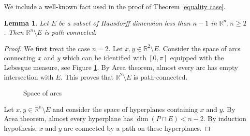 \documentclass[12pt,twoside]{article}
\theoremstyle{plain}
\newtheorem{lem}[theorem]{Lemma}
\theoremstyle{definition}
\theoremstyle{remark}
\newcommand{\R}{\mathbb{R}}
\numberwithin{equation}{section}
\begin{document}
We include a well-known fact used in the proof of Theorem \ref{equality case}.
\begin{lem}\label{path-connected}
Let $E$ be a subset of Hausdorff dimension less than $n-1$ in $\R^n, n \ge 2$. Then $\R^n \setminus E$ is path-connected.
\end{lem}
\begin{proof}
We first treat the case $n=2$. Let $x,y \in \R^2 \setminus E$. Consider the space of arcs connecting $x$ and $y$ which can be identified with $[0,\pi]$ equipped with the Lebesgue measure, see Figure \ref{space of arcs}.  By Area theorem, almost every arc has empty intersection with $E$. This proves that $\R^2 \setminus E$ is path-connected. 

\begin{figure}
\centering
{}
\caption{Space of arcs}
\label{space of arcs}
\end{figure}

Let $x,y \in \R^n \setminus E$ and consider the space of hyperplanes containing $x$ and $y$. By Area theorem, almost every hyperplane has $\dim (P \cap E) < n-2$. By induction hypothesis, $x$ and $y$ are connected by a path on these hyperplanes. 
\end{proof}
\end{document}
